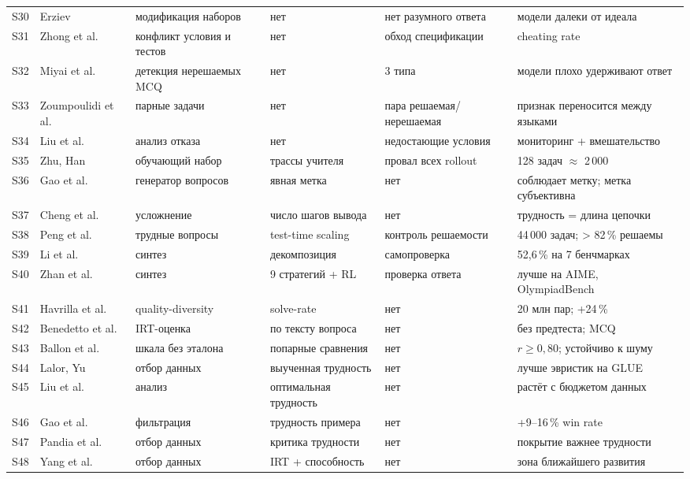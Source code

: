 \documentclass[11pt,a4paper]{article}
\begin{document}
{\begin{longtable}{@{}p{0.65cm}p{2.6cm}p{2.6cm}p{2.9cm}p{2.9cm}p{2.7cm}@{}}
S30 & Erziev \cite{bsbench2025} & модификация наборов & нет & нет разумного ответа & модели далеки от идеала \\
S31 & Zhong et al. \cite{impossiblebench2025} & конфликт условия и тестов & нет & обход спецификации & cheating rate \\
S32 & Miyai et al. \cite{upd2024} & детекция нерешаемых MCQ & нет & 3 типа & модели плохо удерживают ответ \\
S33 & Zoumpoulidi et al. \cite{reliablemath2026} & парные задачи & нет & пара решаемая/нерешаемая & признак переносится между языками \\
S34 & Liu et al. \cite{answering_unanswerable2025} & анализ отказа & нет & недостающие условия & мониторинг + вмешательство \\
S35 & Zhu, Han \cite{unlocking_unsolvable2026} & обучающий набор & трассы учителя & провал всех rollout & 128 задач $\approx$ 2\,000 \\
S36 & Gao et al. \cite{dqg2018} & генератор вопросов & явная метка & нет & соблюдает метку; метка субъективна \\
S37 & Cheng et al. \cite{guiding_growth2021} & усложнение & число шагов вывода & нет & трудность = длина цепочки \\
S38 & Peng et al. \cite{codiq2026} & трудные вопросы & test-time scaling & контроль решаемости & 44\,000 задач; > 82\,\% решаемы \\
S39 & Li et al. \cite{mathmixup2026} & синтез & декомпозиция & самопроверка & 52{,}6\,\% на 7 бенчмарках \\
S40 & Zhan et al. \cite{mathsmith2025} & синтез & 9 стратегий + RL & проверка ответа & лучше на AIME, OlympiadBench \\
S41 & Havrilla et al. \cite{sparq2025} & quality-diversity & solve-rate & нет & 20 млн пар; +24\,\% \\
S42 & Benedetto et al. \cite{r2de2020} & IRT-оценка & по тексту вопроса & нет & без предтеста; MCQ \\
S43 & Ballon et al. \cite{llmcompare2025} & шкала без эталона & попарные сравнения & нет & $r \geq 0{,}80$; устойчиво к шуму \\
S44 & Lalor, Yu \cite{ddaclae2020} & отбор данных & выученная трудность & нет & лучше эвристик на GLUE \\
S45 & Liu et al. \cite{difficulty_tradeoff2026} & анализ & оптимальная трудность & нет & растёт с бюджетом данных \\
S46 & Gao et al. \cite{selective_dpo2025} & фильтрация & трудность примера & нет & +9--16\,\% win rate \\
S47 & Pandia et al. \cite{coverage2026} & отбор данных & критика трудности & нет & покрытие важнее трудности \\
S48 & Yang et al. \cite{zpd2026} & отбор данных & IRT + способность & нет & зона ближайшего развития \\
\end{longtable}
}
\end{document}
